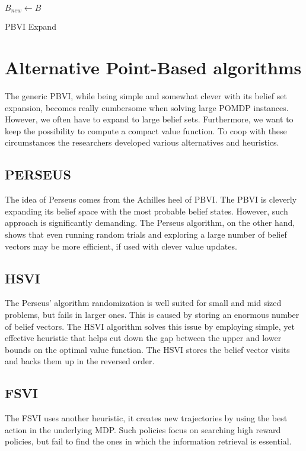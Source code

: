 \LinesNumbered
\begin{algorithm}[H]
\SetAlgoLined
$B_{new} \xleftarrow{} B$ 
\caption{PBVI Expand}
\end{algorithm}



\section{Alternative Point-Based algorithms}

The generic PBVI, while being simple and somewhat clever with its belief set expansion, becomes really cumbersome when solving large POMDP instances. However, we often have to expand to large belief sets. Furthermore, we want to keep the possibility to compute a compact value function. To coop with these circumstances the researchers developed various alternatives and heuristics.


\subsection{PERSEUS \cite{perseus}}

The idea of Perseus comes from the Achilles heel of PBVI. The PBVI is cleverly expanding its belief space with the most probable belief states. However, such approach is significantly demanding. The Perseus algorithm, on the other hand, shows that even running random trials and exploring a large number of belief vectors may be more efficient, if used with clever value updates.


\subsection{HSVI \cite{hsvi}}
The Perseus' algorithm randomization is well suited for small and mid sized problems, but fails in larger ones. This is caused by storing an enormous number of belief vectors. The HSVI algorithm solves this issue by employing simple, yet effective heuristic that helps cut down the gap between the upper and lower bounds on the optimal value function. The HSVI stores the belief vector visits and backs them up in the reversed order.


\subsection{FSVI \cite{fsvi}}
The FSVI uses another heuristic, it creates new trajectories by using the best action in the underlying MDP. Such policies focus on searching high reward policies, but fail to find the ones in which the information retrieval is essential.


